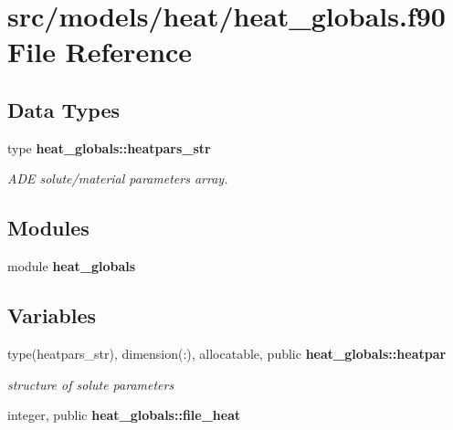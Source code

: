 \section{src/models/heat/heat\+\_\+globals.f90 File Reference}
\label{heat__globals_8f90}
\subsection*{Data Types}
\begin{DoxyCompactItemize}
\item 
type {\bf heat\+\_\+globals\+::heatpars\+\_\+str}
\begin{DoxyCompactList}\small\item\em A\+DE solute/material parameters array. \end{DoxyCompactList}\end{DoxyCompactItemize}
\subsection*{Modules}
\begin{DoxyCompactItemize}
\item 
module {\bf heat\+\_\+globals}
\end{DoxyCompactItemize}
\subsection*{Variables}
\begin{DoxyCompactItemize}
\item 
type(heatpars\+\_\+str), dimension(\+:), allocatable, public {\bf heat\+\_\+globals\+::heatpar}
\begin{DoxyCompactList}\small\item\em structure of solute parameters \end{DoxyCompactList}\item 
integer, public {\bf heat\+\_\+globals\+::file\+\_\+heat}
\end{DoxyCompactItemize}
